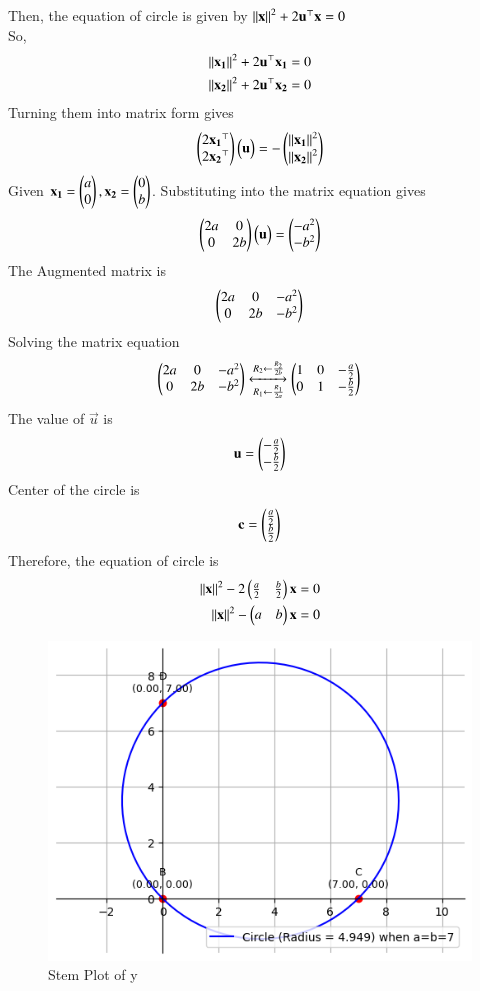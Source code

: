 \documentclass[journal]{IEEEtran}
\begin{document}
Then, the equation of circle is given by  $ \left\lVert\mathbf{x}\right\rVert^{2}+2\mathbf{u}^\top\mathbf{x}=0 $ \\
So,
\begin{align}
 \left\lVert\mathbf{x_{1}}\right\rVert^{2}+2\mathbf{u}^\top\mathbf{x_{1}}=0  \\
 \left\lVert\mathbf{x_{2}}\right\rVert^{2}+2\mathbf{u}^\top\mathbf{x_{2}}=0  
\end{align}
Turning them into matrix form gives
\begin{align}
 \begin{pmatrix}2\mathbf{x_{1}}^\top \\ 2\mathbf{x_{2}}^\top \end{pmatrix}\begin{pmatrix}\mathbf{u}\end{pmatrix} = -\begin{pmatrix}\left\lVert\mathbf{x_{1}}\right\rVert^{2} \\ \left\lVert\mathbf{x_{2}}\right\rVert^{2}\end{pmatrix}
 \end{align}
 Given $\mathbf{x_{1}} = \begin{pmatrix}a \\ 0\end{pmatrix}, \mathbf{x_{2}} = \begin{pmatrix}0 \\ b\end{pmatrix}$. Substituting into the matrix equation gives 
 \begin{align}
     \begin{pmatrix}2a & 0 \\ 0 & 2b\end{pmatrix}\begin{pmatrix}\mathbf{u}\end{pmatrix} = \begin{pmatrix}-a^{2} \\ -b^{2}\end{pmatrix}
 \end{align}
 The Augmented matrix is 
 \begin{align}
     \begin{pmatrix}2a & 0 & -a^{2} \\ 0 & 2b & -b^{2}\end{pmatrix}
 \end{align}
 Solving the matrix equation 
 \begin{align}
     \begin{pmatrix}2a & 0 & -a^{2} \\ 0 & 2b & -b^{2}\end{pmatrix}\xleftrightarrow[R_{1}\leftarrow \frac{R_{1}}{2a}]{R_{2}\leftarrow \frac{R_{2}}{2b}} \begin{pmatrix}1 & 0 & -\frac{a}{2} \\ 0 & 1 & -\frac{b}{2}\end{pmatrix}
 \end{align}
 The value of $\vec{u}$ is 
 \begin{align}
     \mathbf{u}=\begin{pmatrix}-\frac{a}{2} \\ -\frac{b}{2}\end{pmatrix}
 \end{align}
 Center of the circle is
 \begin{align}
     \mathbf{c}=\begin{pmatrix}\frac{a}{2} \\ \frac{b}{2}\end{pmatrix}
 \end{align}
 Therefore, the equation of circle is 
 \begin{align}
      \left\lVert\mathbf{x}\right\rVert^{2}-2\begin{pmatrix}\frac{a}{2} & \frac{b}{2}\end{pmatrix}\mathbf{x}=0  \\
          \left\lVert\mathbf{x}\right\rVert^{2}-\begin{pmatrix}a & b\end{pmatrix}\mathbf{x}=0
      \end{align}
      \begin{figure}[h!]
   \centering
   \includegraphics[width=0.7\linewidth]{figs/plot.png}
   \caption{Stem Plot of y}
   \label{stemplot}
\end{figure}
\end{document}
